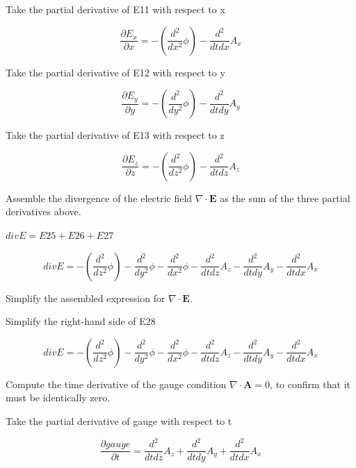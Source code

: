 \documentclass[dvipdfmx]{article}
\begin{document}
Take the partial derivative of E11 with respect to x

\begin{equation}
  \frac{\partial E_x}{\partial x} = -\left(\frac{d^2}{d x^2} \phi\right)-\frac{d^2}{d t d x} A_{x}
  \label{eq:E25}
\end{equation}

Take the partial derivative of E12 with respect to y

\begin{equation}
  \frac{\partial E_y}{\partial y} = -\left(\frac{d^2}{d y^2} \phi\right)-\frac{d^2}{d t d y} A_{y}
  \label{eq:E26}
\end{equation}

Take the partial derivative of E13 with respect to z

\begin{equation}
  \frac{\partial E_z}{\partial z} = -\left(\frac{d^2}{d z^2} \phi\right)-\frac{d^2}{d t d z} A_{z}
  \label{eq:E27}
\end{equation}

Assemble the divergence of the electric field $\nabla\cdot\mathbf E$ as the sum of the three partial derivatives above.

$divE = E25 + E26 + E27$

\begin{equation}
  divE = -\left(\frac{d^2}{d z^2} \phi\right)-\frac{d^2}{d y^2} \phi-\frac{d^2}{d x^2} \phi-\frac{d^2}{d t d z} A_{z}-\frac{d^2}{d t d y} A_{y}-\frac{d^2}{d t d x} A_{x}
  \label{eq:E28}
\end{equation}

Simplify the assembled expression for $\nabla\cdot\mathbf E$.

Simplify the right-hand side of E28

\begin{equation}
  divE = -\left(\frac{d^2}{d z^2} \phi\right)-\frac{d^2}{d y^2} \phi-\frac{d^2}{d x^2} \phi-\frac{d^2}{d t d z} A_{z}-\frac{d^2}{d t d y} A_{y}-\frac{d^2}{d t d x} A_{x}
  \label{eq:E29}
\end{equation}

Compute the time derivative of the gauge condition $\nabla\cdot\mathbf A=0$, to confirm that it must be identically zero.

Take the partial derivative of gauge with respect to t

\begin{equation}
  \frac{\partial gauge}{\partial t} = \frac{d^2}{d t d z} A_{z}+\frac{d^2}{d t d y} A_{y}+\frac{d^2}{d t d x} A_{x}
  \label{eq:E30}
\end{equation}
\end{document}
